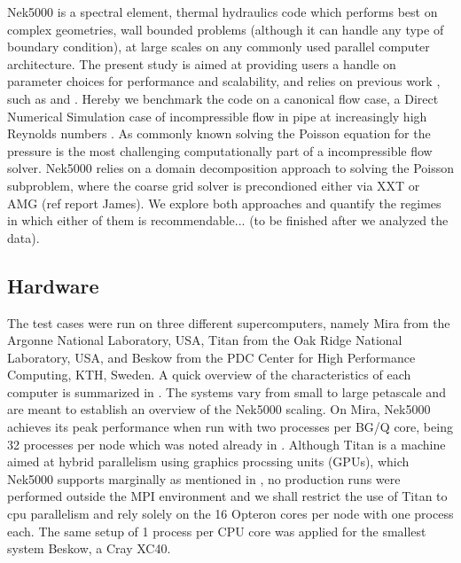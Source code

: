 \documentclass{sig-alternate}
\begin{document}
Nek5000 is a spectral element, thermal hydraulics code which performs best on complex geometries, wall bounded problems (although it can handle any type of boundary condition), at large scales on any commonly used parallel computer architecture. The present study is aimed at providing users a handle on parameter choices for performance and scalability, and relies on previous work , such as \cite{fischer:scaling} and \cite{tufo:terascale}. Hereby we benchmark the code on a canonical flow case, a Direct Numerical Simulation case of incompressible flow in pipe at increasingly high Reynolds numbers \cite{Khoury2013}. As commonly known solving the Poisson equation for the pressure is the most challenging computationally part of a incompressible flow solver. Nek5000 relies on a domain decomposition approach to solving the Poisson subproblem, where the coarse grid solver is precondioned either via XXT \cite{Tufo2001151} or AMG (ref report James). We explore both approaches and quantify the regimes in which either of them is recommendable... (to be finished after we analyzed the data).

\subsection{Hardware}

The test cases were run on three different supercomputers, namely Mira from the
Argonne National Laboratory, USA, Titan from the Oak Ridge National Laboratory,
USA, and Beskow from the PDC Center for High Performance Computing, KTH, Sweden.
A quick overview of the characteristics of each computer is summarized in 
. The systems vary from small to large petascale and are meant to establish an overview of the Nek5000 scaling. On Mira, Nek5000 achieves its
peak performance when run with two processes per BG/Q core, being 32 processes
per node which was noted already in \cite{fischer:scaling}. Although Titan is a machine aimed at hybrid parallelism using graphics procssing units (GPUs), which Nek5000 supports marginally as mentioned in \cite{Otten2016}, no production runs were performed outside the MPI environment and we shall restrict the use of Titan to cpu parallelism and rely solely
on the 16 Opteron cores per node with one process each. The same setup of 1
process per CPU core was applied for the smallest system Beskow, a Cray XC40.
\end{document}
